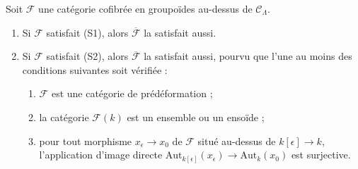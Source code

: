 \begin{lemma}
\label{lemma-S1-S2-associated-functor}
Soit $\mathcal{F}$ une catégorie cofibrée en groupoïdes au-dessus de
$\mathcal{C}_\Lambda$.
\begin{enumerate}
\item Si $\mathcal{F}$ satisfait (S1), alors $\overline{\mathcal{F}}$ la
satisfait aussi.
\item Si $\mathcal{F}$ satisfait (S2), alors $\overline{\mathcal{F}}$ la
satisfait aussi, pourvu que l'une au moins des conditions suivantes soit
vérifiée :
\begin{enumerate}
\item $\mathcal{F}$ est une catégorie de prédéformation ;
\item la catégorie $\mathcal{F}(k)$ est un ensemble ou un ensoïde ;
\item pour tout morphisme $x_\epsilon \to x_0$ de $\mathcal{F}$ situé
au-dessus de $k[\epsilon] \to k$, l'application d'image directe
$\text{Aut}_{k[\epsilon]}(x_\epsilon) \to \text{Aut}_k(x_0)$
est surjective.
\end{enumerate}
\end{enumerate}
\end{lemma}

